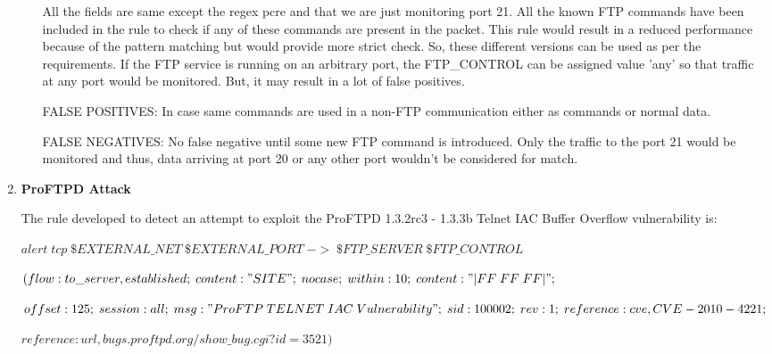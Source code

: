 \documentclass[11pt, pdftex]{article}
\begin{document}
\begin{enumerate}
\begin{itemize}
All the fields are same except the regex pcre and that we are just monitoring port 21. All the known FTP commands have been included in the rule to check if any of these commands are present in the packet. 
This rule would result in a reduced performance because of the pattern matching but would provide more strict check. So, these different versions can be used as per the requirements. If the FTP service is running on an arbitrary port, the FTP\_CONTROL can be assigned value 'any' so that traffic at any port would be monitored. But, it may result in a lot of false positives. 



FALSE POSITIVES: In case same commands are used in a non-FTP communication either as commands or normal data.



FALSE NEGATIVES: No false negative until some new FTP command is introduced. Only the traffic to the port 21 would be monitored and thus, data arriving at port 20 or any other port wouldn't be considered for match.
	
\end{itemize}

	\item \textbf{ProFTPD Attack}	

The rule developed to detect an attempt to exploit the ProFTPD 1.3.2rc3 - 1.3.3b Telnet IAC Buffer Overflow vulnerability is: 

$alert\; tcp\; \$EXTERNAL\_NET\; \$EXTERNAL\_PORT\; ->\; \$FTP\_SERVER\; \$FTP\_CONTROL\;$


$(flow:to\_server,established;\;content:"SITE";\;nocase;\; within:10;\; content:"|FF\; FF\; FF|";\;$ 

$offset:125;\;session:all;\; msg:"ProFTP\; TELNET\; IAC\; Vulnerability";\; sid:100002;\; rev:1;\; reference:cve,CVE-2010-4221;\;$

$reference:url,bugs.proftpd.org/show\_bug.cgi?id=3521)$



\end{enumerate}
\end{document}
